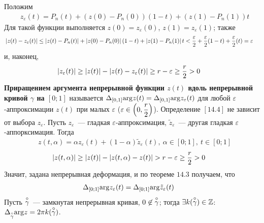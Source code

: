 Положим
\begin{align*}
  & z_\varepsilon(t) = P_n(t) + \left( z(0)-P_n(0) \right)\left( 1-t \right) + \left( z(1)-P_n(1) \right)t
\end{align*}
Для такой функции выполняется $z(0) = z_\varepsilon(0)$, $z(1) =
z_\varepsilon(1)$; также
\begin{align*}
  & \left|{z(t) - z_\varepsilon(t)}\right| \leq \left|{z(t) - P_n(t)}\right| + \left| z(0)-P_n(0) \right| \left( 1-t \right) + \left| z(1)-P_n(1) \right|t < \frac{\varepsilon}{2} + \frac{\varepsilon}{2}(1-t) + \frac{\varepsilon}{2}(t) = \varepsilon
\end{align*}
и, наконец,
\begin{align*}
  & \left|{z_\varepsilon(t)}\right| \geq \left| z(t) \right| - \left| z(t) - z_\varepsilon(t) \right| \geq r - \varepsilon \geq \frac{r}{2} > 0
\end{align*}
\Def
\textbf{Приращением аргумента непрерывной функции $z(t)$ вдоль непрерывной
  кривой $\gamma$ на $[0;1]$} называется $\Delta_{[0,1]}\mathrm{arg} z(t) =
\Delta_{[0,1]}\mathrm{arg} z_\varepsilon(t)$ для любой $\varepsilon$-аппроксимации
$z(t)$ при малых $\varepsilon$ ($\varepsilon \in \left( 0, \displaystyle \frac{r}{2}
\right)$).
\prop
Определение $[14.4]$ не зависит от выбора $z_\varepsilon$.
\pr
Пусть $z_\varepsilon$~--- гладкая $\varepsilon$-аппроксимация,
$\tilde{z}_\varepsilon$~--- другая гладкая $\varepsilon$-аппорксимация.
Тогда
\begin{align*}
  & z(t, \alpha) = \alpha z_\varepsilon(t) + (1-\alpha)\tilde{z}_\varepsilon(t), \ \alpha \in [0;1], \ t \in [0;1]
\end{align*}
\begin{align*}
  & \left|{z(t, \alpha)}\right| \geq \left| z(t) \right| - \left| z(t, \alpha) - z(t) \right| > r - \varepsilon \geq \frac{r}{2} > 0
\end{align*}
Значит, задана непрерывная деформация, и по теореме $14.3$ получаем, что
\begin{align*}
  & \Delta_{[0;1]}\mathrm{arg} z_\varepsilon(t) = \Delta_{[0;1]}\mathrm{arg} \tilde{z}_\varepsilon(t)
\end{align*}
\corollary
Пусть $\overset{\circ}{\gamma}$~--- замкнутая непрерывная кривая, $0 \not \in
\overset{\circ}{\gamma}$; тогда $\exists k(\overset{\circ}{\gamma})\in \mathbb{Z}$:
$\Delta_{\overset{\circ}{\gamma}}\mathrm{arg} z = 2 \pi k(\overset{\circ}{\gamma})$.
